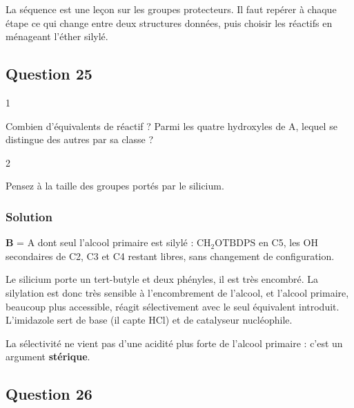 \documentclass[11pt,a4paper]{article}
\begin{document}
La séquence est une leçon sur les groupes protecteurs. Il faut repérer à chaque étape ce qui change entre deux structures données, puis choisir les réactifs en ménageant l'éther silylé.

\hypertarget{question-25}{%
\subsection{Question 25}\label{question-25}}

\begin{indication}{1}

Combien d'équivalents de réactif ? Parmi les quatre hydroxyles de A, lequel se distingue des autres par sa classe ?

\end{indication}

\begin{indication}{2}

Pensez à la taille des groupes portés par le silicium.

\end{indication}

\hypertarget{solution-24}{%
\subsubsection{Solution}\label{solution-24}}

\textbf{B} = A dont seul l'alcool primaire est silylé : \(\mathrm{CH_2OTBDPS}\) en C5, les OH secondaires de C2, C3 et C4 restant libres, sans changement de configuration.

Le silicium porte un tert-butyle et deux phényles, il est très encombré. La silylation est donc très sensible à l'encombrement de l'alcool, et l'alcool primaire, beaucoup plus accessible, réagit sélectivement avec le seul équivalent introduit. L'imidazole sert de base (il capte HCl) et de catalyseur nucléophile.

\begin{piege}

La sélectivité ne vient pas d'une acidité plus forte de l'alcool primaire : c'est un argument \textbf{stérique}.

\end{piege}

\hypertarget{question-26}{%
\subsection{Question 26}\label{question-26}}
\end{document}
